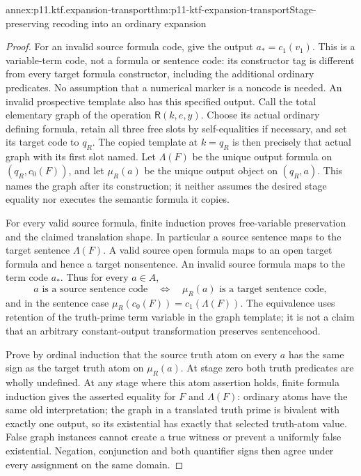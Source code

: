 \begin{annexitem}{annex:p11.ktf.expansion-transport}{thm:p11-ktf-expansion-transport}{Stage-preserving recoding into an ordinary expansion}
\begin{proof}
For an invalid source formula code, give the output
\(a_* = c_1(v_1)\). This is a variable-term code, not a formula
or sentence code: its constructor tag is different from every target
formula constructor, including the additional ordinary predicates.
No assumption that a numerical marker is a noncode is needed.
An invalid prospective template also has this specified output.
Call the total elementary graph of the operation \(\mathsf R(k,e,y)\).
Choose its actual ordinary defining formula, retain all three free
slots by self-equalities if necessary, and set its target code to
\(q_R\). The copied template at \(k=q_R\) is then precisely
that actual graph with its first slot named. Let \(\Lambda(F)\)
be the unique output formula on \((q_R,c_0(F))\), and let
\(\mu_R(a)\) be the unique output object on \((q_R,a)\).
This names the graph after its construction; it neither assumes
the desired stage equality nor executes the semantic formula it copies.

For every valid source formula, finite induction proves free-variable
preservation and the claimed translation shape. In particular a source
sentence maps to the target sentence \(\Lambda(F)\). A valid
source open formula maps to an open target formula and hence a target
nonsentence. An invalid source formula maps to the term code \(a_*\).
Thus for every \(a\in A\),
\[
 a\text{ is a source sentence code}\quad\Longleftrightarrow\quad
 \mu_R(a)\text{ is a target sentence code},
\]
and in the sentence case
\(\mu_R(c_0(F))=c_1(\Lambda(F))\). The equivalence uses
retention of the truth-prime term variable in the graph template;
it is not a claim that an arbitrary constant-output transformation
preserves sentencehood.

Prove by ordinal induction that the source truth atom on every
\(a\) has the same sign as the target truth atom on \(\mu_R(a)\).
At stage zero both truth predicates are wholly undefined. At any
stage where this atom assertion holds, finite formula induction gives
the asserted equality for \(F\) and \(\Lambda(F)\): ordinary
atoms have the same old interpretation; the graph in a translated
truth prime is bivalent with exactly one output, so its existential
has exactly that selected truth-atom value. False graph instances
cannot create a true witness or prevent a uniformly false existential.
Negation, conjunction and both quantifier signs then agree under
every assignment on the same domain.


\end{proof}
\end{annexitem}
